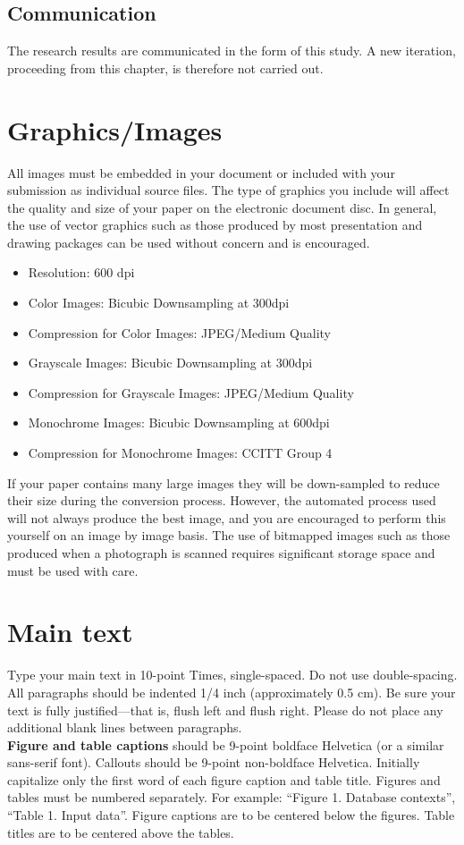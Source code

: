 \documentclass[10pt]{article}
\begin{document}
\subsection{Communication}

The research results are communicated in the form of this study.
A new iteration, proceeding from this chapter, is therefore not
carried out.

\section{Graphics/Images}

All images must be embedded in your document or included with your submission as individual source files. The type of graphics you include will affect the quality and size of your paper on the electronic document disc. In general, the use of vector graphics such as those produced by most presentation and drawing packages can be used without concern and is encouraged.

\begin{itemize}
    \item Resolution: 600 dpi
    \item Color Images: Bicubic Downsampling at 300dpi
    \item Compression for Color Images: JPEG/Medium Quality
    \item Grayscale Images: Bicubic Downsampling at 300dpi
    \item Compression for Grayscale Images: JPEG/Medium Quality
    \item Monochrome Images: Bicubic Downsampling at 600dpi
    \item Compression for Monochrome Images: CCITT Group 4
\end{itemize}

If your paper contains many large images they will be down-sampled to reduce their size during the conversion process.  However, the automated process used will not always produce the best image, and you are encouraged to perform this yourself on an image by image basis. The use of bitmapped images such as those produced when a photograph is scanned requires significant storage space and must be used with care.

\section{Main text}

Type your main text in 10-point Times, single-spaced. Do not use double-spacing. All paragraphs should be indented 1/4 inch (approximately 0.5 cm).  Be sure your text is fully justified—that is, flush left and flush right. Please do not place any additional blank lines between paragraphs. \\
\textbf{Figure and table captions} should be 9-point boldface Helvetica (or a similar sans-serif font).  Callouts should be 9-point non-boldface Helvetica. Initially capitalize only the first word of each figure caption and table title. Figures and tables must be numbered separately. For example: ``Figure 1. Database contexts'', ``Table 1. Input data''. Figure captions are to be centered below the figures. Table titles are to be centered above the tables.
\end{document}
